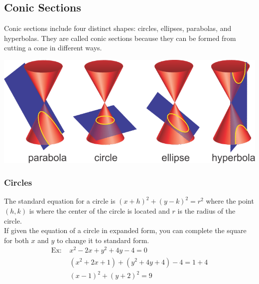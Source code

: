 \subsection{Conic Sections}
Conic sections include four distinct shapes: circles, ellipses, parabolas, and hyperbolas. They are called conic sections because they can be formed from cutting a cone in different ways.\\
\centerline{\includegraphics[scale=0.5]{Images/PreCalcPictures/ConicSections.png}}

\subsubsection{Circles}
The standard equation for a circle is $(x+h)^2+(y-k)^2=r^2$ where the point $(h,k)$ is where the center of the circle is located and $r$ is the radius of the circle.\\
If given the equation of a circle in expanded form, you can complete the square for both $x$ and $y$ to change it to standard form.\\
\begin{align*}
    \text{Ex: } &x^2-2x+y^2+4y-4=0\\
    &(x^2+2x+1)+(y^2+4y+4)-4=1+4\\
    &(x-1)^2+(y+2)^2=9
\end{align*}

